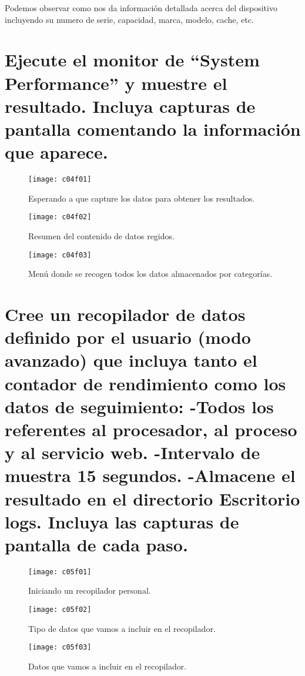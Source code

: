 Podemos observar como nos da información detallada acerca del dispositivo incluyendo su numero de serie, capacidad, marca, modelo, cache, etc.

\section{Ejecute el monitor de “System Performance” y muestre el resultado. Incluya capturas de pantalla comentando la información que aparece.}


\begin{figure}[H]
	\centering
	\texttt{[image: c04f01]}
	\caption{Esperando a que capture los datos para obtener los resultados.}
	\label{fig:c04f01}
\end{figure}
\begin{figure}[H]
	\centering
	\texttt{[image: c04f02]}
	\caption{Resumen del contenido de datos regidos.}
	\label{fig:c04f02}
\end{figure}
\begin{figure}[H]
	\centering
	\texttt{[image: c04f03]}
	\caption{Menú donde se recogen todos los datos almacenados por categorías.}
	\label{fig:c04f03}
\end{figure}




\section{Cree un recopilador de datos definido por el usuario (modo	avanzado) que incluya tanto el contador de rendimiento como los datos de 	seguimiento: -Todos los referentes al procesador, al proceso y al servicio web. -Intervalo de muestra 15 segundos. -Almacene el resultado en el directorio Escritorio \\logs. Incluya las capturas de pantalla de cada paso.}

\begin{figure}[H]
	\centering
	\texttt{[image: c05f01]}
	\caption{Iniciando un recopilador personal.}
	\label{fig:c05f01}
\end{figure}
\begin{figure}[H]
	\centering
	\texttt{[image: c05f02]}
	\caption{Tipo de datos que vamos a incluir en el recopilador.}
	\label{fig:c05f02}
\end{figure}
\begin{figure}[H]
	\centering
	\texttt{[image: c05f03]}
	\caption{Datos que vamos a incluir en el recopilador.}
	\label{fig:c05f03}
\end{figure}

